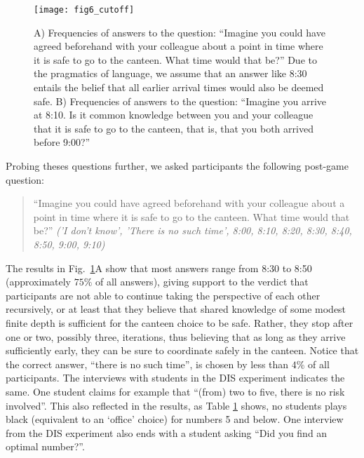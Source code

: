 \begin{figure} %
\centering\texttt{[image: fig6\_cutoff]}
\caption{A) Frequencies of answers to the question: ``Imagine you could have agreed beforehand with your colleague about a point in time where it is safe to go to the canteen. What time would that be?'' Due to the pragmatics of language, we assume that an answer like 8:30 entails the belief that all earlier arrival times would also be deemed safe. B) Frequencies of answers to the question: ``Imagine you arrive at 8:10. Is it common knowledge between you and your colleague that it is safe to go to the canteen, that is, that you both arrived before 9:00?''}
\label{fig:5} %
\end{figure}
Probing theses questions further, we asked participants the following post-game question:
\begin{quote}
\indent
``Imagine you could have agreed beforehand with your colleague about a point in time where it is safe to go to the canteen. What time would that be?'' \textit{('I don't know', 'There is no such time', 8:00, 8:10, 8:20, 8:30, 8:40, 8:50, 9:00, 9:10)}
\end{quote}
The results in Fig.~\ref{fig:5}A show that most answers range from 8:30 to 8:50 (approximately $75\%$ of all answers), giving support to the verdict that participants are not able to continue taking the perspective of each other recursively, or at least that they believe that shared knowledge of some modest finite depth is sufficient for the canteen choice to be safe. Rather, they stop after one or two, possibly three, iterations, thus believing that as long as they arrive sufficiently early, they can be sure to coordinate safely in the canteen. Notice that the correct answer, ``there is no such time'', is chosen by less than $4\%$ of all participants. The interviews with students in the DIS experiment indicates the same. One student claims for example that ``(from) two to five, there is no risk involved''. This also reflected in the results, as Table \ref{fig:5} shows, no students plays black (equivalent to an `office' choice) for numbers 5 and below. One interview from the DIS experiment also ends with a student asking ``Did you find an optimal number?''. 

